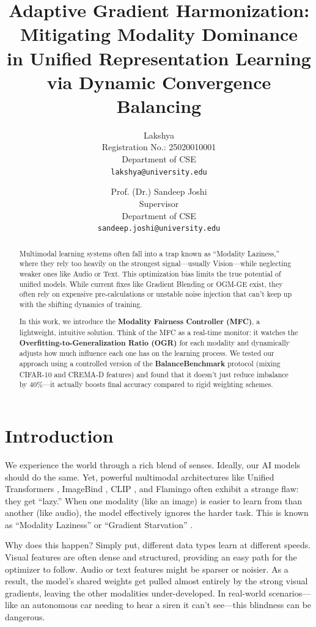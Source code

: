 \documentclass[10pt, twocolumn, letterpaper]{article}
\title{\textbf{Adaptive Gradient Harmonization: Mitigating Modality Dominance \\ in Unified Representation Learning via Dynamic Convergence Balancing}}
\author{
Lakshya \\
Registration No.: 25020010001 \\
Department of CSE \\
{\tt\small lakshya@university.edu}
\and
Prof. (Dr.) Sandeep Joshi \\
Supervisor \\
Department of CSE \\
{\tt\small sandeep.joshi@university.edu}
}
\begin{document}
\maketitle

\begin{abstract}
Multimodal learning systems often fall into a trap known as ``Modality Laziness,'' where they rely too heavily on the strongest signal—usually Vision—while neglecting weaker ones like Audio or Text. This optimization bias limits the true potential of unified models. While current fixes like Gradient Blending or OGM-GE exist, they often rely on expensive pre-calculations or unstable noise injection that can't keep up with the shifting dynamics of training.

In this work, we introduce the \textbf{Modality Fairness Controller (MFC)}, a lightweight, intuitive solution. Think of the MFC as a real-time monitor: it watches the \textbf{Overfitting-to-Generalization Ratio (OGR)} for each modality and dynamically adjusts how much influence each one has on the learning process. We tested our approach using a controlled version of the \textbf{BalanceBenchmark} protocol (mixing CIFAR-10 and CREMA-D features) and found that it doesn't just reduce imbalance by 40\%—it actually boosts final accuracy compared to rigid weighting schemes.
\end{abstract}

\section{Introduction}
We experience the world through a rich blend of senses. Ideally, our AI models should do the same. Yet, powerful multimodal architectures like Unified Transformers \cite{meta_transformer}, ImageBind \cite{imagebind}, CLIP \cite{clip}, and Flamingo \cite{flamingo} often exhibit a strange flaw: they get ``lazy.'' When one modality (like an image) is easier to learn from than another (like audio), the model effectively ignores the harder task. This is known as ``Modality Laziness'' or ``Gradient Starvation'' \cite{gradient_starvation}.

Why does this happen? Simply put, different data types learn at different speeds. Visual features are often dense and structured, providing an easy path for the optimizer to follow. Audio or text features might be sparser or noisier. As a result, the model's shared weights get pulled almost entirely by the strong visual gradients, leaving the other modalities under-developed. In real-world scenarios—like an autonomous car needing to hear a siren it can't see—this blindness can be dangerous.
\end{document}
